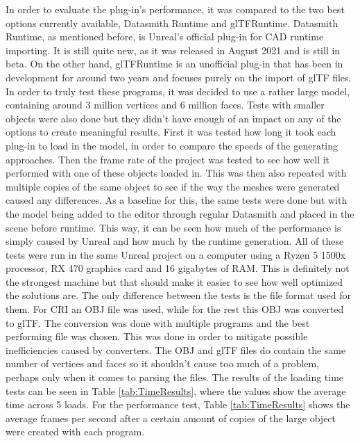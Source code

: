 In order to evaluate the plug-in's performance, it was compared to the two best options currently available, Datasmith Runtime and glTFRuntime. Datasmith Runtime, as mentioned before, is Unreal's official plug-in for CAD runtime importing. It is still quite new, as it was released in August 2021 and is still in beta\cite{bib:DSRunDoc}. On the other hand, glTFRuntime is an unofficial plug-in that has been in development for around two years and focuses purely on the import of glTF files\cite{bib:glTFRun}.\\
In order to truly test these programs, it was decided to use a rather large model, containing around 3 million vertices and 6 million faces. Tests with smaller objects were also done but they didn't have enough of an impact on any of the options to create meaningful results. First it was tested how long it took each plug-in to load in the model, in order to compare the speeds of the generating approaches. Then the frame rate of the project was tested to see how well it performed with one of these objects loaded in. This was then also repeated with multiple copies of the same object to see if the way the meshes were generated caused any differences. As a baseline for this, the same tests were done but with the model being added to the editor through regular Datasmith and placed in the scene before runtime. This way, it can be seen how much of the performance is simply caused by Unreal and how much by the runtime generation. All of these tests were run in the same Unreal project on a computer using a Ryzen 5 1500x processor, RX 470 graphics card and 16 gigabytes of RAM. This is definitely not the strongest machine but that should make it easier to see how well optimized the solutions are. The only difference between the tests is the file format used for them. For \acs{CRI} an OBJ file was used, while for the rest this OBJ was converted to glTF. The conversion was done with multiple programs and the best performing file was chosen. This was done in order to mitigate possible inefficiencies caused by converters. The OBJ and glTF files do contain the same number of vertices and faces so it shouldn't cause too much of a problem, perhaps only when it comes to parsing the files. The results of the loading time tests can be seen in Table \ref{tab:TimeResults}, where the values show the average time across 5 loads. For the performance test, Table \ref{tab:TimeResults} shows the average frames per second after a certain amount of copies of the large object were created with each program.\\


